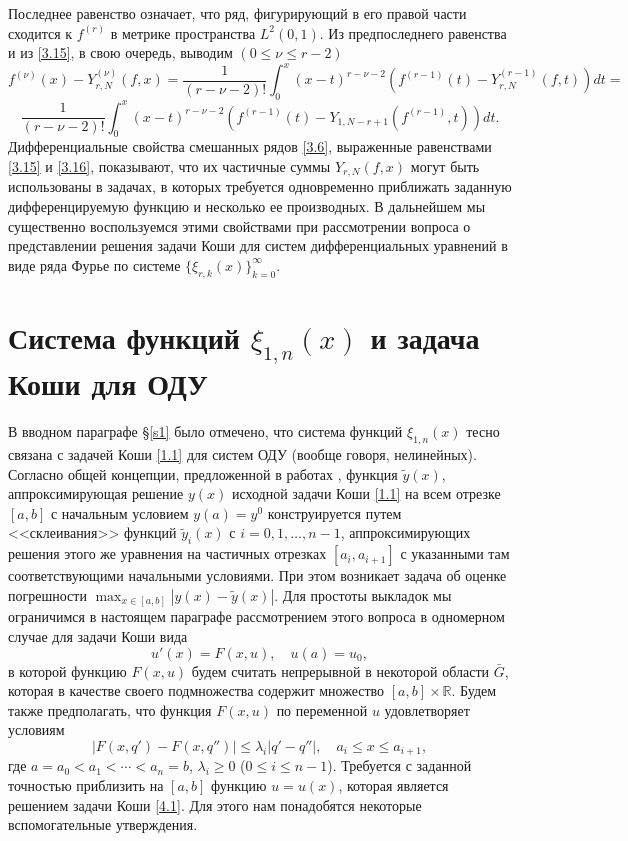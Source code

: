 \documentclass{article}
\numberwithin{equation}{section}
\theoremstyle{plain}
\theoremstyle{definition}
\begin{document}
\begin{fulltext}
Последнее равенство  означает, что ряд, фигурирующий  в его правой части сходится к $f^{(r)}$ в метрике пространства  $L^2(0,1)$. Из предпоследнего равенства и из  \eqref{3.15}, в свою очередь, выводим $(0\le\nu\le r-2)$
 $$
f^{(\nu)}(x)-Y_{r,N}^{(\nu)}(f,x)= \frac{1}{(r-\nu-2)!}\int_0^x (x-t)^{r-\nu-2}(f^{(r-1)}(t)-Y_{r,N}^{(r-1)}(f,t))dt=
$$
  \begin{equation}\label{3.18}
\frac{1}{(r-\nu-2)!}\int_0^x (x-t)^{r-\nu-2}(f^{(r-1)}(t)-Y_{1,N-r+1}(f^{(r-1)},t))dt.
 \end{equation}
Дифференциальные свойства смешанных рядов \eqref{3.6}, выраженные равенствами \eqref{3.15} и \eqref{3.16}, показывают, что их частичные суммы $Y_{r,N}(f,x)$  могут быть использованы в задачах, в которых требуется одновременно приближать заданную дифференцируемую функцию и несколько ее производных. В дальнейшем мы существенно воспользуемся этими свойствами при рассмотрении вопроса о представлении решения задачи Коши для систем дифференциальных уравнений в виде ряда Фурье по системе $\{\xi_{r,k}(x)\}_{k=0}^\infty$.



\section{Система функций $\xi_{1,n}(x)$ и задача Коши для ОДУ  }\label{s4}
 В  вводном параграфе \S \ref{s1}  было  отмечено, что система функций  $\xi_{1,n}(x)$ тесно связана с задачей Коши \eqref{1.1} для систем ОДУ (вообще говоря, нелинейных). Согласно общей концепции, предложенной в работах   \cite{SharDagElec7,SharMagDagElec8}, функция $\tilde y(x)$, аппроксимирующая решение $y(x)$ исходной задачи Коши \eqref{1.1} на всем отрезке $[a,b]$  с начальным условием $y(a)=y^0$ конструируется путем <<склеивания>>  функций $\tilde y_i(x)$ с $i=0,1,\ldots, n-1$, аппроксимирующих решения этого же уравнения на частичных отрезках $[a_i,a_{i+1}]$ с указанными там соответствующими начальными условиями. При этом возникает задача об оценке погрешности $\max_{x\in[a,b]}|y(x)-\tilde y(x)|$. Для простоты выкладок мы ограничимся в настоящем параграфе рассмотрением этого вопроса в одномерном случае для задачи Коши вида
\begin{equation}\label{4.1}
u'(x)=F(x,u), \quad u(a)=u_0,
\end{equation}
 в которой функцию   $F(x,u)$  будем считать непрерывной в некоторой области $\bar G$, которая в качестве своего подмножества содержит множество $[a,b]\times\mathbb{R}$. Будем также предполагать, что функция $F(x,u)$ по переменной $u$  удовлетворяет условиям
 \begin{equation}\label{4.2}
|F(x,q')-F(x,q'')|\le \lambda_i|q'-q''|, \quad a_i\le x \le a_{i+1},
\end{equation}
где $a=a_0<a_1<\cdots<a_n=b$,  $\lambda_i\geq0$ ($0\leq i\leq n-1$). Требуется с заданной точностью приблизить на $[a,b]$ функцию  $u=u(x)$, которая является   решением задачи Коши \eqref{4.1}. Для этого нам понадобятся некоторые вспомогательные утверждения.


\end{fulltext}
\end{document}
